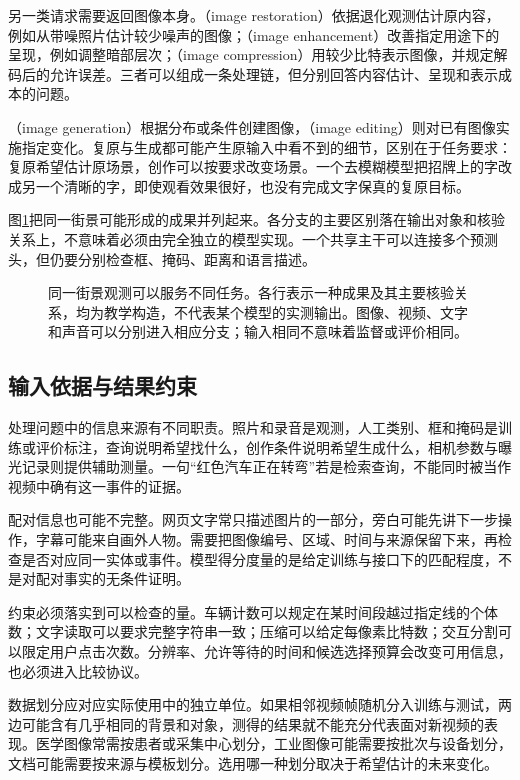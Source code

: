 另一类请求需要返回图像本身。（image restoration）依据退化观测估计原内容，例如从带噪照片估计较少噪声的图像；（image enhancement）改善指定用途下的呈现，例如调整暗部层次；（image compression）用较少比特表示图像，并规定解码后的允许误差。三者可以组成一条处理链，但分别回答内容估计、呈现和表示成本的问题。

（image generation）根据分布或条件创建图像，（image editing）则对已有图像实施指定变化。复原与生成都可能产生原输入中看不到的细节，区别在于任务要求：复原希望估计原场景，创作可以按要求改变场景。一个去模糊模型把招牌上的字改成另一个清晰的字，即使观看效果很好，也没有完成文字保真的复原目标。

图\ref{fig:vision-task-map}把同一街景可能形成的成果并列起来。各分支的主要区别落在输出对象和核验关系上，不意味着必须由完全独立的模型实现。一个共享主干可以连接多个预测头，但仍要分别检查框、掩码、距离和语言描述。

\begin{figure}[htbp]
  \centering
  
  \caption{同一街景观测可以服务不同任务。各行表示一种成果及其主要核验关系，均为教学构造，不代表某个模型的实测输出。图像、视频、文字和声音可以分别进入相应分支；输入相同不意味着监督或评价相同。}
  \label{fig:vision-task-map}
\end{figure}

\subsection{输入依据与结果约束}
\label{sec:vision-overview-evidence}

处理问题中的信息来源有不同职责。照片和录音是观测，人工类别、框和掩码是训练或评价标注，查询说明希望找什么，创作条件说明希望生成什么，相机参数与曝光记录则提供辅助测量。一句“红色汽车正在转弯”若是检索查询，不能同时被当作视频中确有这一事件的证据。

配对信息也可能不完整。网页文字常只描述图片的一部分，旁白可能先讲下一步操作，字幕可能来自画外人物。需要把图像编号、区域、时间与来源保留下来，再检查是否对应同一实体或事件。模型得分度量的是给定训练与接口下的匹配程度，不是对配对事实的无条件证明。

约束必须落实到可以检查的量。车辆计数可以规定在某时间段越过指定线的个体数；文字读取可以要求完整字符串一致；压缩可以给定每像素比特数；交互分割可以限定用户点击次数。分辨率、允许等待的时间和候选选择预算会改变可用信息，也必须进入比较协议。

数据划分应对应实际使用中的独立单位。如果相邻视频帧随机分入训练与测试，两边可能含有几乎相同的背景和对象，测得的结果就不能充分代表面对新视频的表现。医学图像常需按患者或采集中心划分，工业图像可能需要按批次与设备划分，文档可能需要按来源与模板划分。选用哪一种划分取决于希望估计的未来变化。

